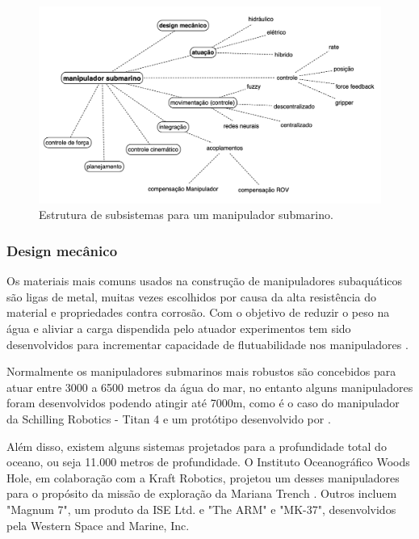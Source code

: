 \begin{figure}[H] 
  \begin{center} 
  	\includegraphics[width=0.9 \textwidth]{images/manipuladorsubmarino.png} 
  \end{center} 
  \caption{Estrutura de subsistemas para um manipulador submarino.} 
  \label{fig:estrusub} 
\end{figure}

\subsubsection{Design mecânico}
\label{sec:desmeca}

Os materiais mais comuns usados ​​na construção de manipuladores subaquáticos são ligas de metal, muitas vezes escolhidos por causa da alta resistência do material e propriedades contra corrosão. Com o objetivo de reduzir o peso na água e aliviar a carga dispendida pelo atuador experimentos tem sido desenvolvidos para incrementar capacidade de flutuabilidade nos manipuladores \cite{ishimi1991manipulation}.

Normalmente os manipuladores submarinos mais robustos são concebidos para atuar entre 3000 a 6500 metros da água do mar, no entanto alguns manipuladores foram desenvolvidos podendo atingir até 7000m, como é o caso do manipulador da Schilling Robotics - Titan 4 e um protótipo desenvolvido por .

Além disso, existem alguns sistemas projetados para a profundidade total do oceano, ou seja 11.000 metros de profundidade. O Instituto Oceanográfico Woods Hole, em colaboração com a Kraft Robotics, projetou um desses manipuladores para o propósito da missão de exploração da Mariana Trench \cite{bowen2008nereus}. Outros incluem "Magnum 7", um produto da ISE Ltd. e "The ARM" e "MK-37", desenvolvidos pela Western Space and Marine, Inc.

